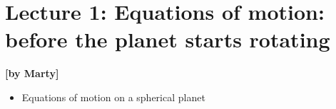 
\section{Lecture 1: Equations of motion: before the planet starts rotating}\label{sec:lecture1}
\begin{flushright}\textbf{[by Marty]}\end{flushright}

  \begin{itemize}
    \item
    Equations of motion on a spherical planet
 \end{itemize}
